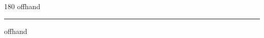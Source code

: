 
\begin{frame}
\begin{center}
\begin{turn}{180}
{\fontsize{2.5cm}{1em}\selectfont offhand}
\end{turn}
\vspace{1em}\par  
\hrule
\vspace{1em}\par  
{\fontsize{2.5cm}{1em}\selectfont offhand}
\end{center}
\end{frame}
